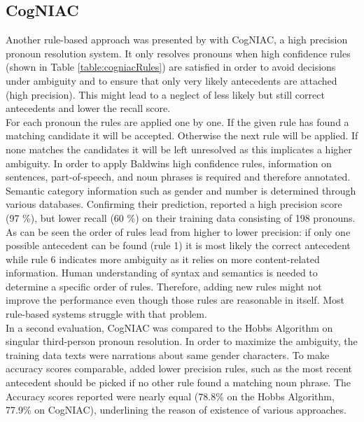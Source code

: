 \subsection{CogNIAC}
Another rule-based approach was presented by \citep{baldwin1997cogniac} with CogNIAC, a high precision pronoun resolution system. It only resolves pronouns when high confidence rules (shown in Table \ref{table:cogniacRules}) are satisfied in order to avoid decisions under ambiguity and to ensure that only very likely antecedents are attached (high precision). This might lead to a neglect of less likely but still correct antecedents and lower the recall score. 
\\
For each pronoun the rules are applied one by one. If the given rule has found a matching candidate it will be accepted. Otherwise the next rule will be applied. If none matches the candidates it will be left unresolved as this implicates a higher ambiguity. In order to apply Baldwins high confidence rules, information on sentences, part-of-speech, and noun phrases is required and therefore annotated. Semantic category information such as gender and number is determined through various databases. Confirming their prediction, \citep{baldwin1997cogniac} reported a high precision score (97 \%), but lower recall (60 \%) on their training data consisting of 198 pronouns.\\
As can be seen the order of rules lead from higher to lower precision: if only one possible antecedent can be found (rule 1) it is most likely the correct antecedent while rule 6 indicates more ambiguity as it relies on more content-related information. Human understanding of syntax and semantics is needed to determine a specific order of rules. Therefore, adding new rules might not improve the performance even though those rules are reasonable in itself. Most rule-based systems struggle with that problem.\\
In a second evaluation, CogNIAC was compared to the Hobbs Algorithm \citep{baldwin1997cogniac,hobbs1978resolving} on singular third-person pronoun resolution. In order to maximize the ambiguity, the training data texts were narrations about same gender characters. To make accuracy scores comparable, \cite{baldwin1997cogniac} added lower precision rules, such as the most recent antecedent should be picked if no other rule found a matching noun phrase. The Accuracy scores reported were nearly equal (78.8\% on the Hobbs Algorithm, 77.9\% on CogNIAC), underlining the reason of existence of various approaches.

